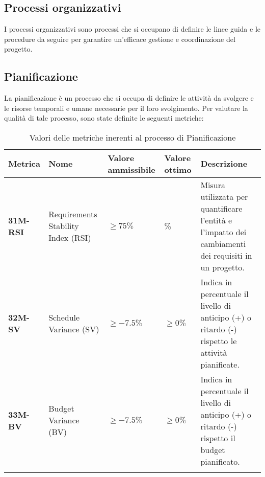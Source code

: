 \subsection{Processi organizzativi}
I processi organizzativi sono processi che si occupano di definire le linee guida e le procedure da seguire per garantire
un'efficace gestione e coordinazione del progetto.
\subsection{Pianificazione}
La pianificazione è un processo che si occupa di definire le attività da svolgere e le risorse temporali e umane necessarie
per il loro svolgimento. Per valutare la qualità di tale processo, sono state definite le seguenti metriche:

\begin{longtable}{|>{\raggedright\arraybackslash}m{}|>{\raggedright\arraybackslash}m{}|>{\raggedright\arraybackslash}m{}|>{\raggedright\arraybackslash}m{}|>{\raggedright\arraybackslash}m{}|}
	\hline
	\textbf{Metrica} & \textbf{Nome}                      & \textbf{Valore ammissibile} & \textbf{Valore ottimo} & \textbf{Descrizione}                                                                                  \\
	\hline
	\endfirsthead
	\hline
	\textbf{31M-RSI} & Requirements Stability Index (RSI) & $\geq 75\% $                & 100\%                  & Misura utilizzata per quantificare l’entità e l’impatto dei cambiamenti dei requisiti in un progetto. \\
	\hline
	\textbf{32M-SV}  & Schedule Variance (SV)             & $\geq -7.5\%$               & $\geq 0\%$             & Indica in percentuale il livello di anticipo (+) o ritardo (-) rispetto le attività pianificate.              \\
	\hline
	\textbf{33M-BV}  & Budget Variance (BV)               & $\geq -7.5\%$               & $\geq 0\%$             & Indica in percentuale il livello di anticipo (+) o ritardo (-) rispetto il budget pianificato.                \\
	\hline
	\caption{Valori delle metriche inerenti al processo di Pianificazione}
	\label{table:11}
\end{longtable}
